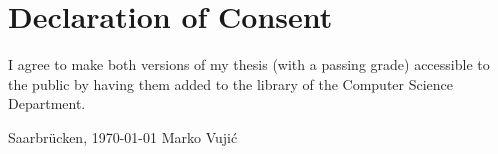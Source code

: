 \documentclass[11pt, a4paper, twoside]{Thesis}
\newcommand{\listofalgorithmes}{\tocfile{\listalgorithmcfname}{loa}}
\begin{document}
\section*{Declaration of Consent}
I agree to make both versions of my thesis (with a passing grade) accessible to the public by having
them added to the library of the Computer Science Department.
\vspace{3cm}

\begin{flushright}
\noindent Saarbr\"{u}cken, \today
\hfill
Marko Vuji\'c
\end{flushright}

\clearpage  %





\clearpage  %


\begin{spacing}{0.1}
\pagestyle{fancy}
\tableofcontents
\listoffigures	
\end{spacing}

\clearpage

\mainmatter
%
%


%
%
%
%



{\small}
\clearpage

\appendix



%
\end{document}

